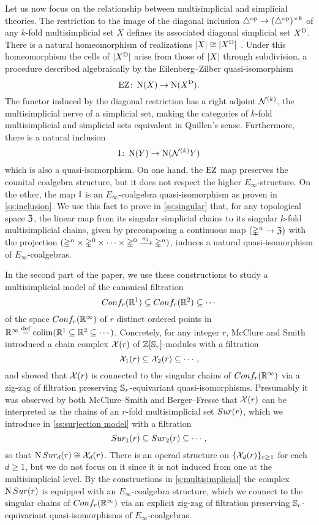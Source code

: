 Let us now focus on the relationship between multisimplicial and simplicial theories.
The restriction to the image of the diagonal inclusion $\triangle^{\mathrm{op}} \to (\triangle^{\mathrm{op}})^{\times k}$ of any $k$-fold multisimplicial set $X$ defines its associated diagonal simplicial set $X^{\mathrm{D}}$.
There is a natural homeomorphism of realizations $\lvert X\rvert \cong \lvert X^{\mathrm{D}}\rvert$
\cite{Quillen}.
Under this homeomorphism the cells of $\lvert X^{\mathrm{D}}\rvert$ arise from those of $\lvert X\rvert$ through subdivision, a procedure described algebraically by the Eilenberg--Zilber quasi-isomorphism
\[
\operatorname{EZ} \colon \operatorname{N}(X) \to \operatorname{N}(X^{\mathrm{D}}).
\]
The functor induced by the diagonal restriction has a right adjoint $\mathcal{N}^{(k)}$, the multisimplicial nerve of a simplicial set, making the categories of $k$-fold multisimplicial and simplicial sets equivalent in Quillen's sense.
Furthermore, there is a natural inclusion
\[
\operatorname{I} \colon \operatorname{N}(Y) \to \operatorname{N}(\mathcal{N}^{(k)} Y)
\]
which is also a quasi-isomorphism.
On one hand, the $\operatorname{EZ}$ map preserves the counital coalgebra structure, but it does not respect the higher $E_\infty$-structure.
On the other, the map $\operatorname{I}$ is an $E_\infty$-coalgebra quasi-isomorphism as proven in \cref{ss:inclusion}.
We use this fact to prove in \cref{ss:singular} that, for any topological space $\mathfrak{Z}$, the linear map from its singular simplicial chains to its singular $k$-fold multisimplicial chains, given by precomposing a continuous map $(\mathbb{\Delta}^n \to \mathfrak{Z})$ with the projection $(\mathbb{\Delta}^n \times \mathbb{\Delta}^{0}\times\dots\times\mathbb{\Delta}^{0} \xrightarrow{\pi_1} \mathbb{\Delta}^n)$, induces a natural quasi-isomorphism of $E_\infty$-coalgebras.

In the second part of the paper, we use these constructions to study a multisimplicial model of the canonical filtration
\[
Conf_{r}(\mathbb{R}^{1}) \subseteq Conf_{r}(\mathbb{R}^{2}) \subseteq \dotsb
\]
of the space $Conf_{r}(\mathbb{R}^{\infty})$ of $r$ distinct ordered points in $\mathbb{R}^\infty \stackrel{\mathrm{def}}{=} \operatorname*{colim} (\mathbb{R}^1 \subseteq \mathbb{R}^2 \subseteq \dotsb)$.
Concretely, for any integer $r$, McClure and Smith \cite{mcclure2003multivariable} introduced a chain complex $\mathcal{X}(r)$ of $\mathbb{Z}[\mathbb{S}_r]$-modules with a filtration
\[
\mathcal{X}_{1}(r) \subseteq \mathcal{X}_{2}(r) \subseteq \dotsb \,,
\]
and showed that $\mathcal{X}(r)$ is connected to the singular chains of $Conf_{r}(\mathbb{R}^{\infty})$ via a zig-zag of filtration preserving $\mathbb{S}_r$-equivariant quasi-isomorphisms.
Presumably it was observed by both McClure--Smith and Berger--Fresse that $\mathcal{X}(r)$ can be interpreted as the chains of an $r$-fold multisimplicial set $Sur(r)$, which we introduce in \cref{ss:surjection model} with a filtration
\[
Sur_{1}(r) \subseteq Sur_{2}(r) \subseteq \dotsb \,,
\]
so that $\operatorname{N}Sur_{d}(r) \cong \mathcal{X}_{d}(r)$.
There is an operad structure on $\{\mathcal{X}_{d}(r)\}_{r \geq 1}$ for each $d \geq 1$, but we do not focus on it since it is not induced from one at the multisimplicial level.
By the constructions in \cref{s:multisimplicial} the complex $\operatorname{N}Sur(r)$ is equipped with an $E_\infty$-coalgebra structure, which we connect to the singular chains of $Conf_{r}(\mathbb{R}^{\infty})$ via an explicit zig-zag of filtration preserving $\mathbb{S}_r$-equivariant quasi-isomorphisms of $E_\infty$-coalgebras.

